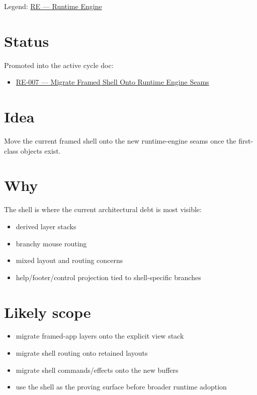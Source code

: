 Legend: \href{https://github.com/flyingrobots/bijou/blob/1853ad902f6bf219326409e7f743a5a1d6517dbc/docs/method/legends/RE-runtime-engine.md}{RE --- Runtime Engine}

\section{Status}\label{record-396-status}

Promoted into the active cycle doc:

\begin{itemize}
\tightlist
\item
  \href{https://github.com/flyingrobots/bijou/blob/cbd70612140e7a450d764b3c7be1c6af878b99bc/docs/design/RE-007-migrate-framed-shell-onto-runtime-engine-seams.md}{RE-007 --- Migrate Framed Shell Onto Runtime Engine Seams}
\end{itemize}

\section{Idea}\label{record-396-idea}

Move the current framed shell onto the new runtime-engine seams once the first-class objects exist.

\section{Why}\label{record-396-why}

The shell is where the current architectural debt is most visible:

\begin{itemize}
\tightlist
\item
  derived layer stacks
\item
  branchy mouse routing
\item
  mixed layout and routing concerns
\item
  help/footer/control projection tied to shell-specific branches
\end{itemize}

\section{Likely scope}\label{record-396-likely-scope}

\begin{itemize}
\tightlist
\item
  migrate framed-app layers onto the explicit view stack
\item
  migrate shell routing onto retained layouts
\item
  migrate shell commands/effects onto the new buffers
\item
  use the shell as the proving surface before broader runtime adoption
\end{itemize}

